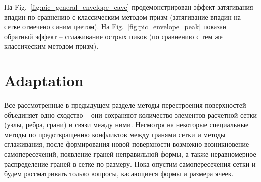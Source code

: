 \documentclass[
11pt,%
tightenlines,%
twoside,%
onecolumn,%
nofloats,%
nobibnotes,%
nofootinbib,%
superscriptaddress,%
noshowpacs,%
centertags]%
{revtex4}
\begin{document}
На Fig.~\ref{fig:pic_general_envelope_cave} продемонстрирован эффект затягивания впадин по сравнению с классическим методом призм (затягивание впадин на сетке отмечено синим цветом). На Fig.~\ref{fig:pic_envelope_peak} показан обратный эффект -- сглаживание острых пиков (по сравнению с тем же классическим методом призм).


\section{Adaptation}

Все рассмотренные в предыдущем разделе методы перестроения поверхностей объединяет одно сходство -- они сохраняют количество элементов расчетной сетки (узлы, ребра, грани) и связи между ними.
Несмотря на некоторые специальные методы по предотвращению конфликтов между гранями сетки и методы сглаживания, после формирования новой поверхности возможно возникновение самопересечений, появление граней неправильной формы, а также неравномерное распределение граней в сетке по размеру.
Пока опустим самопересечения сетки и будем рассматривать только вопросы, касающиеся формы и размера ячеек.
\end{document}
